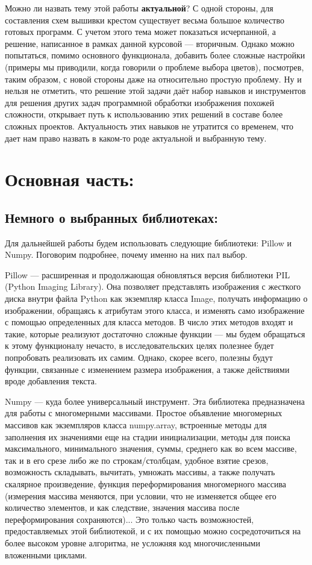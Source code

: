 \documentclass[12pt]{article}
\begin{document}
{	Можно ли назвать тему этой работы {\bf актуальной}? С одной стороны, для составления схем вышивки крестом существует весьма большое количество готовых программ. С учетом этого тема может показаться исчерпанной, а решение, написанное в рамках данной курсовой — вторичным. Однако можно попытаться, помимо основного функционала, добавить более сложные настройки (примеры мы приводили, когда говорили о проблеме выбора цветов), посмотрев, таким образом, с новой стороны даже на относительно простую проблему. Ну и нельзя не отметить, что решение этой задачи даёт набор навыков и инструментов для решения других задач программной обработки изображения похожей сложности, открывает путь к использованию этих решений в составе более сложных проектов. Актуальность этих навыков не утратится со временем, что дает нам право назвать в каком-то роде актуальной и выбранную тему.
	
	
	\section{Основная часть:}
	\label{main}
	
	\subsection{Немного о выбранных библиотеках:}
	\label{libraries}
	Для дальнейшей работы будем использовать следующие библиотеки: Pillow и Numpy. Поговорим подробнее, почему именно на них пал выбор.
	
	Pillow --- расширенная и продолжающая обновляться версия библиотеки PIL (Python Imaging Library). Она позволяет представлять изображения с жесткого диска внутри файла Python как экземпляр класса Image, получать информацию о изображении, обращаясь к атрибутам этого класса, и изменять само изображение с помощью определенных для класса методов. В число этих методов входят и такие, которые реализуют достаточно сложные функции --- мы будем обращаться к этому функционалу нечасто, в исследовательских целях полезнее будет попробовать реализовать их самим. Однако, скорее всего, полезны будут функции, связанные с изменением размера изображения, а также действиями вроде добавления текста.
	
	Numpy --- куда более универсальный инструмент. Эта библиотека предназначена для работы с многомерными массивами. Простое объявление многомерных массивов как экземпляров класса numpy.array, встроенные методы для заполнения их значениями еще на стадии инициализации, методы для поиска максимального, минимального значения, суммы, среднего как во всем массиве, так и в его срезе либо же по строкам/столбцам, удобное взятие срезов, возможность складывать, вычитать, умножать массивы, а также получать скалярное произведение, функция переформирования многомерного массива (измерения массива меняются, при условии, что не изменяется общее его количество элементов, и как следствие, значения массива после переформирования сохраняются)... Это только часть возможностей, предоставляемых этой библиотекой, и с их помощью можно сосредоточиться на более высоком уровне алгоритма, не усложняя код многочисленными вложенными циклами.
	
}
\end{document}
